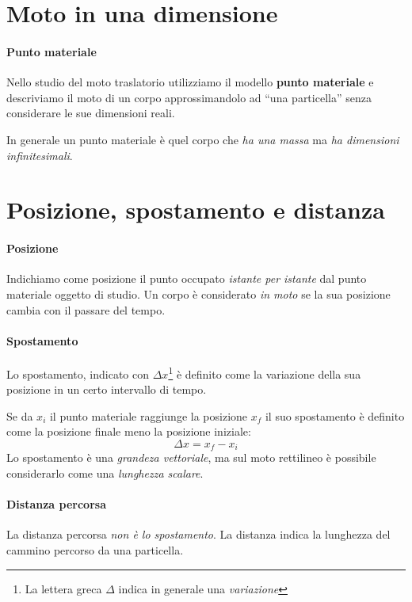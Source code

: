 \documentclass[a4paper,11pt,oneside]{book}
\begin{document}
\section{Moto in una dimensione}

\paragraph{Punto materiale}
Nello studio del moto traslatorio utilizziamo il modello \textbf{punto materiale} e descriviamo il moto di un corpo approssimandolo ad
“una particella” senza considerare le sue dimensioni reali.

In generale un punto materiale è quel corpo che \emph{ha una massa} ma \emph{ha dimensioni infinitesimali}.

\section{Posizione, spostamento e distanza}

\paragraph{Posizione} Indichiamo come posizione il punto occupato \emph{istante per istante} dal punto materiale oggetto di studio.
Un corpo è considerato \emph{in moto} se la sua posizione cambia con il passare del tempo.

\paragraph{Spostamento} Lo spostamento, indicato con $\Delta x$\footnote{La lettera greca $\Delta$ indica in generale una \emph{variazione}} è definito come la variazione della sua posizione in un certo intervallo di tempo.

Se da $x_i$ il punto materiale raggiunge la posizione $x_f$ il suo spostamento è definito come la posizione finale meno la posizione iniziale:
\begin{equation*}
    \Delta x = x_f - x_i
\end{equation*}
Lo spostamento è una \emph{grandeza vettoriale}, ma sul moto rettilineo è possibile considerarlo come una \emph{lunghezza scalare}.

\paragraph{Distanza percorsa}
La distanza percorsa \emph{non è lo spostamento}. La distanza indica la lunghezza del cammino percorso da una particella.
\end{document}
